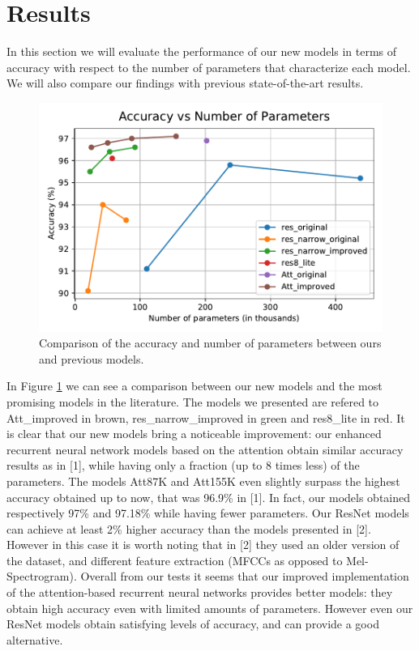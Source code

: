 
\section{Results}
\label{sec:results}

In this section we will evaluate the performance of our new models in terms of accuracy with respect to the number of parameters that characterize each model. We will also compare our findings with previous state-of-the-art results.

\begin{figure}[htbp]
\centerline{\includegraphics[scale=.6]{acc_vs_par.pdf}}
\caption{Comparison of the accuracy and number of parameters between ours and previous models.}
\label{avp}
\end{figure}

In Figure \ref{avp} we can see a comparison between our new models and the most promising models in the literature. The models we presented are refered to Att\_improved in brown, res\_narrow\_improved in green and res8\_lite in red.
It is clear that our new models bring a noticeable improvement: our enhanced recurrent neural network models based on the attention obtain similar accuracy results as in [1], while having only a fraction (up to 8 times less) of the parameters. The models Att87K and Att155K even slightly surpass the highest accuracy obtained up to now, that was 96.9\% in [1]. In fact, our models obtained respectively 97\% and 97.18\% while having fewer parameters. 
Our ResNet models can achieve at least 2\% higher accuracy than the models presented in [2]. However in this case it is worth noting that in [2] they used an older version of the dataset, and different feature extraction (MFCCs as opposed to Mel-Spectrogram). Overall from our tests it seems that our improved implementation of the attention-based recurrent neural networks provides better models: they obtain high accuracy even with limited amounts of parameters. However even our ResNet models obtain satisfying levels of accuracy, and can provide a good alternative.


